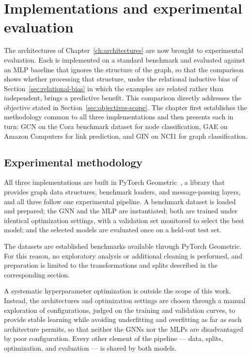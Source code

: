 \chapter{Implementations and experimental evaluation}
\label{ch:implementations}
\minitoc

The architectures of Chapter~\ref{ch:architectures} are now brought to
experimental evaluation. Each is implemented on a standard benchmark
and evaluated against an MLP baseline that ignores the structure of the graph,
so that the comparison shows whether processing that structure, under the
relational inductive bias of Section~\ref{sec:relational-bias} in which the
examples are related rather than independent, brings a predictive benefit.
This comparison directly addresses the objective stated in Section~\ref{sec:objectives-scope}.
The chapter first establishes the methodology common to all three implementations
and then presents each in turn: GCN on the Cora benchmark dataset for node classification,
GAE on Amazon Computers for link prediction, and GIN on NCI1 for graph classification.

\section{Experimental methodology}
\label{sec:methodology}

All three implementations are built in PyTorch
Geometric~\cite[-2.1pc]{fey2019}, a library that provides graph data structures,
benchmark loaders, and message-passing layers, and all three follow one
experimental pipeline. A benchmark dataset is loaded and prepared;
the GNN and the MLP are instantiated; both are trained under identical optimization
settings, with a validation set monitored to select the best model; and the
selected models are evaluated once on a held-out test set.

The datasets are established benchmarks available through PyTorch Geometric.
For this reason, no exploratory analysis or additional cleaning is performed,
and preparation is limited to the transformations and splits described in the
corresponding section.

A systematic hyperparameter optimization is outside the scope of this work.
Instead, the architectures and optimization settings are chosen through a
manual exploration of configurations, judged on the training and validation
curves, to provide stable learning while avoiding underfitting and overfitting
as far as each architecture permits, so that neither the GNNs nor the MLPs are
disadvantaged by poor configuration. Every other element of the pipeline ---
data, splits, optimization, and evaluation --- is shared by both models.

